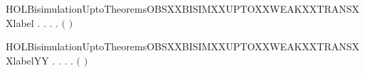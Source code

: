 \newcommand{\HOLBisimulationUptoTheoremsOBSXXBISIMXXUPTOXXTRANSYY}{\UseVerbatim{HOLBisimulationUptoTheoremsOBSXXBISIMXXUPTOXXTRANSYY}}
\begin{SaveVerbatim}{HOLBisimulationUptoTheoremsOBSXXBISIMXXUPTOXXWEAKXXTRANSXXlabel}
\HOLTokenTurnstile{} \HOLSymConst{\HOLTokenForall{}}.
         \HOLSymConst{\HOLTokenImp{}}
       \HOLSymConst{\HOLTokenForall{}} .
              \HOLSymConst{\HOLTokenImp{}}
           \HOLSymConst{\HOLTokenForall{}} .
                \HOLTokenWeakTransBegin{} \HOLTokenWeakTransEnd {} \HOLSymConst{\HOLTokenImp{}}
               \HOLSymConst{\HOLTokenExists{}}.
                    \HOLTokenWeakTransBegin{} \HOLTokenWeakTransEnd {} \HOLSymConst{\HOLTokenConj{}}
                   \ensuremath{(}    \ensuremath{)}  
\end{SaveVerbatim}
\newcommand{\HOLBisimulationUptoTheoremsOBSXXBISIMXXUPTOXXWEAKXXTRANSXXlabel}{\UseVerbatim{HOLBisimulationUptoTheoremsOBSXXBISIMXXUPTOXXWEAKXXTRANSXXlabel}}
\begin{SaveVerbatim}{HOLBisimulationUptoTheoremsOBSXXBISIMXXUPTOXXWEAKXXTRANSXXlabelYY}
\HOLTokenTurnstile{} \HOLSymConst{\HOLTokenForall{}}.
         \HOLSymConst{\HOLTokenImp{}}
       \HOLSymConst{\HOLTokenForall{}} .
              \HOLSymConst{\HOLTokenImp{}}
           \HOLSymConst{\HOLTokenForall{}} .
                \HOLTokenWeakTransBegin{} \HOLTokenWeakTransEnd {} \HOLSymConst{\HOLTokenImp{}}
               \HOLSymConst{\HOLTokenExists{}}.
                    \HOLTokenWeakTransBegin{} \HOLTokenWeakTransEnd {} \HOLSymConst{\HOLTokenConj{}}
                   \ensuremath{(}    \ensuremath{)}  
\end{SaveVerbatim}
